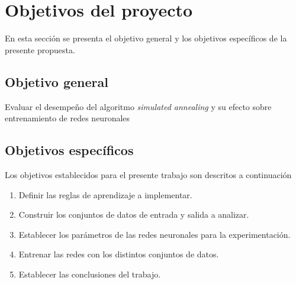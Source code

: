 \section{Objetivos del proyecto}
En esta sección se presenta el objetivo general y los objetivos específicos de la presente propuesta.

\subsection{Objetivo general}
Evaluar el desempeño del algoritmo {\em simulated annealing} y su efecto sobre entrenamiento de redes neuronales


\subsection{Objetivos específicos}
Los objetivos establecidos para el presente trabajo son descritos a continuación
\begin{enumerate}
    \item Definir las reglas de aprendizaje a implementar.
    \item Construir los conjuntos de datos de entrada y salida a analizar.
	\item Establecer los parámetros de las redes neuronales para la experimentación.
	\item Entrenar las redes con los distintos conjuntos de datos.
    \item Establecer las conclusiones del trabajo.
\end{enumerate}

